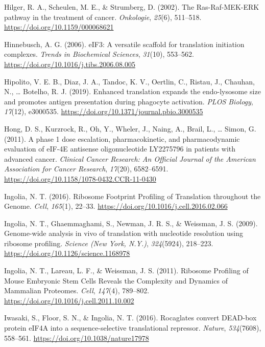 \documentclass[12pt,openany]{book}
\begin{document}
\hypertarget{ref-Hilger2002}{}
Hilger, R. A., Scheulen, M. E., \& Strumberg, D. (2002). The
Ras-Raf-MEK-ERK pathway in the treatment of cancer. \emph{Onkologie},
\emph{25}(6), 511--518. \url{https://doi.org/10.1159/000068621}

\hypertarget{ref-Hinnebusch2006}{}
Hinnebusch, A. G. (2006). eIF3: A versatile scaffold for translation
initiation complexes. \emph{Trends in Biochemical Sciences},
\emph{31}(10), 553--562.
\url{https://doi.org/10.1016/j.tibs.2006.08.005}

\hypertarget{ref-Hipolito2019}{}
Hipolito, V. E. B., Diaz, J. A., Tandoc, K. V., Oertlin, C., Ristau, J.,
Chauhan, N., \ldots{} Botelho, R. J. (2019). Enhanced translation
expands the endo-lysosome size and promotes antigen presentation during
phagocyte activation. \emph{PLOS Biology}, \emph{17}(12), e3000535.
\url{https://doi.org/10.1371/journal.pbio.3000535}

\hypertarget{ref-Hong2011}{}
Hong, D. S., Kurzrock, R., Oh, Y., Wheler, J., Naing, A., Brail, L.,
\ldots{} Simon, G. (2011). A phase 1 dose escalation, pharmacokinetic,
and pharmacodynamic evaluation of eIF-4E antisense oligonucleotide
LY2275796 in patients with advanced cancer. \emph{Clinical Cancer
Research: An Official Journal of the American Association for Cancer
Research}, \emph{17}(20), 6582--6591.
\url{https://doi.org/10.1158/1078-0432.CCR-11-0430}

\hypertarget{ref-Ingolia2016}{}
Ingolia, N. T. (2016). Ribosome Footprint Profiling of Translation
throughout the Genome. \emph{Cell}, \emph{165}(1), 22--33.
\url{https://doi.org/10.1016/j.cell.2016.02.066}

\hypertarget{ref-Ingolia2009}{}
Ingolia, N. T., Ghaemmaghami, S., Newman, J. R. S., \& Weissman, J. S.
(2009). Genome-wide analysis in vivo of translation with nucleotide
resolution using ribosome profiling. \emph{Science (New York, N.Y.)},
\emph{324}(5924), 218--223.
\url{https://doi.org/10.1126/science.1168978}

\hypertarget{ref-Ingolia2011}{}
Ingolia, N. T., Lareau, L. F., \& Weissman, J. S. (2011). Ribosome
Profiling of Mouse Embryonic Stem Cells Reveals the Complexity and
Dynamics of Mammalian Proteomes. \emph{Cell}, \emph{147}(4), 789--802.
\url{https://doi.org/10.1016/j.cell.2011.10.002}

\hypertarget{ref-Iwasaki2016}{}
Iwasaki, S., Floor, S. N., \& Ingolia, N. T. (2016). Rocaglates convert
DEAD-box protein eIF4A into a sequence-selective translational
repressor. \emph{Nature}, \emph{534}(7608), 558--561.
\url{https://doi.org/10.1038/nature17978}
\end{document}
